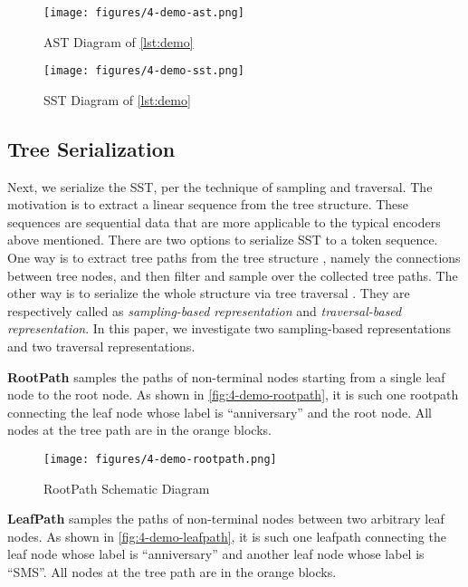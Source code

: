 \documentclass[conference]{IEEEtran}
\begin{document}
\begin{figure}[!htb]
  \centering
  \texttt{[image: figures/4-demo-ast.png]}
  \caption{AST Diagram of \autoref{lst:demo}}
  \label{fig:4-demo-ast}
\end{figure}

\begin{figure}[!htb]
  \centering
  \texttt{[image: figures/4-demo-sst.png]}
  \caption{SST Diagram of \autoref{lst:demo}}
  \label{fig:4-demo-sst}
\end{figure}

\subsection{Tree Serialization}
\label{subsec:serialization}

Next, we serialize the SST, per the technique of sampling and traversal. The motivation is to extract a linear sequence from the tree structure. These sequences are sequential data that are more applicable to the typical encoders above mentioned.
There are two options to serialize SST to a token sequence. One way is to extract tree paths from the tree structure \cite{Alon2018AGP,Kim2020CodePB}, namely the connections between tree nodes, and then filter and sample over the collected tree paths. The other way is to serialize the whole structure via tree traversal \cite{Hu2018DeepCC,Chen2018TreetotreeNN}. They are respectively called as \emph{sampling-based representation} and \emph{traversal-based representation}.
In this paper, we investigate two sampling-based representations and two traversal representations.

\textbf{RootPath} \cite{Alon2018AGP} samples the paths of non-terminal nodes starting from a single leaf node to the root node. As shown in \autoref{fig:4-demo-rootpath}, it is such one rootpath connecting the leaf node whose label is ``anniversary'' and the root node. All nodes at the tree path are in the orange blocks.

\begin{figure}[!htb]
  \centering
  \texttt{[image: figures/4-demo-rootpath.png]}
  \caption{RootPath Schematic Diagram}
  \label{fig:4-demo-rootpath}
\end{figure}

\textbf{LeafPath} \cite{Kim2020CodePB} samples the paths of non-terminal nodes between two arbitrary leaf nodes. As shown in \autoref{fig:4-demo-leafpath}, it is such one leafpath connecting the leaf node whose label is ``anniversary'' and another leaf node whose label is ``SMS''. All nodes at the tree path are in the orange blocks.
\end{document}
